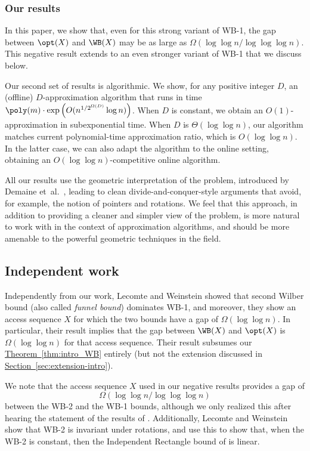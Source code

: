 \documentclass[11pt]{article}
\numberwithin{equation}{section}
\theoremstyle{definition}
\theoremstyle{plain}
\newcommand{\expref}[2]{\hyperref[#2]{#1~\ref{#2}}}
\begin{document}
\subsubsection{Our results} 


In this paper, we show that, even for this strong variant of WB-1, the gap between $\opt(X)$ and $\WB(X)$ may be as large as $\Omega(\log \log n/ \log \log \log n)$.  This negative result extends to an even stronger variant of WB-1 that we discuss below.
%
%


Our second set of results is algorithmic.
We show, for any positive integer $D$, an (offline) $D$-approximation algorithm that runs in time $\poly(m)\cdot \exp\left(O(n^{1/2^{\Omega(D)}}\log n)\right )$. 
When $D$ is constant, we obtain an $O(1)$-approximation in subexponential time. When $D$ is $\Theta(\log \log n)$, our algorithm matches current polynomial-time approximation ratio, which is $O(\log\log n)$. In the latter case, we can also adapt the algorithm to the online setting, obtaining an $O(\log\log n)$-competitive online algorithm.

All our results use the geometric interpretation of the problem, introduced by Demaine et~al.~\cite{DHIKP09}, leading to clean divide-and-conquer-style arguments that avoid, for example, the notion of pointers and rotations.
We feel that this approach, in addition to providing a cleaner and simpler view of the problem, is more natural to work with in the context of approximation algorithms, and should be more amenable to the powerful geometric techniques in the field. 
%
%




\subsection{Independent work}
Independently from our work, Lecomte and Weinstein \cite{LW19} showed that second Wilber bound (also called \emph{funnel bound}) dominates WB-1, and moreover, they show an access sequence $X$ for which the two bounds have a gap of $\Omega(\log\log n)$. 
In particular, their result implies that the gap between $\WB(X)$ and $\opt(X)$ is $\Omega(\log\log n)$ for that access sequence. Their result subsumes our \expref{Theorem}{thm:intro_WB} entirely (but not the extension discussed in \expref{Section}{sec:extension-intro}).    


We note that the access sequence $X$  used in our negative results  provides a gap of
%
\[
\Omega(\log\log n/\log\log\log n)
\]
 between the WB-2 and the WB-1 bounds, although we only realized this after hearing the statement of the results of \cite{LW19}. Additionally, Lecomte and Weinstein show that WB-2 is invariant under rotations, and use this to show that, when the WB-2 is constant, then the Independent Rectangle bound of \cite{DHIKP09} is linear.
\end{document}
